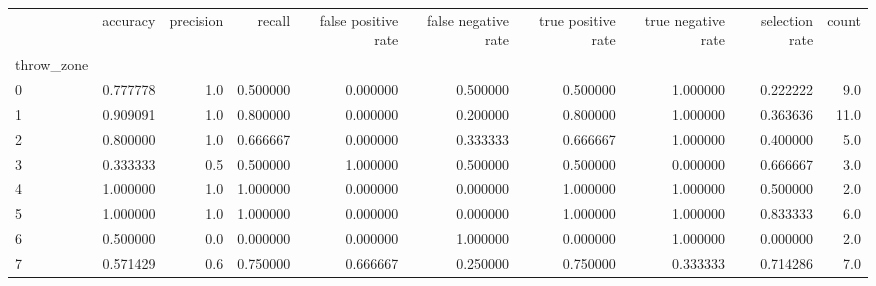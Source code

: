 \begin{tabular}{lrrrrrrrrr}
\toprule
{} &  accuracy &  precision &    recall &  false positive rate &  false negative rate &  true positive rate &  true negative rate &  selection rate &  count \\
throw\_zone &           &            &           &                      &                      &                     &                     &                 &        \\
\midrule
0          &  0.777778 &        1.0 &  0.500000 &             0.000000 &             0.500000 &            0.500000 &            1.000000 &        0.222222 &    9.0 \\
1          &  0.909091 &        1.0 &  0.800000 &             0.000000 &             0.200000 &            0.800000 &            1.000000 &        0.363636 &   11.0 \\
2          &  0.800000 &        1.0 &  0.666667 &             0.000000 &             0.333333 &            0.666667 &            1.000000 &        0.400000 &    5.0 \\
3          &  0.333333 &        0.5 &  0.500000 &             1.000000 &             0.500000 &            0.500000 &            0.000000 &        0.666667 &    3.0 \\
4          &  1.000000 &        1.0 &  1.000000 &             0.000000 &             0.000000 &            1.000000 &            1.000000 &        0.500000 &    2.0 \\
5          &  1.000000 &        1.0 &  1.000000 &             0.000000 &             0.000000 &            1.000000 &            1.000000 &        0.833333 &    6.0 \\
6          &  0.500000 &        0.0 &  0.000000 &             0.000000 &             1.000000 &            0.000000 &            1.000000 &        0.000000 &    2.0 \\
7          &  0.571429 &        0.6 &  0.750000 &             0.666667 &             0.250000 &            0.750000 &            0.333333 &        0.714286 &    7.0 \\
\bottomrule
\end{tabular}
